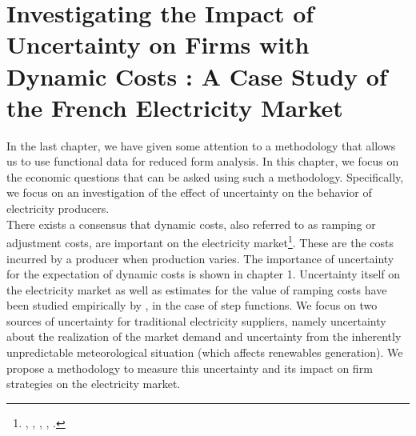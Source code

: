 

\renewcommand{\thesection}{\arabic{chapter}.\arabic{section}}


\chapter{Investigating the Impact of Uncertainty on Firms with Dynamic Costs : A Case Study of the French Electricity Market}
\label{chap:ch2}
\cleardoublepage

\doublespacing
In the last chapter, we have given some attention to a methodology that allows us to use functional data for reduced form analysis. In this chapter, we focus on the economic questions that can be asked using such a methodology. Specifically, we focus on an investigation of the effect of uncertainty on the behavior of electricity producers. \\

There exists a consensus that dynamic costs, also referred to as ramping or adjustment costs, are important on the electricity market\footnote{ \cite{anderson2005supply},  \cite{hobbs2001next}, \cite{hortacsu2008understanding}, \cite{reguant2011welfare}, \cite{sewalt2003negative}. }. These are the costs incurred by a producer when production varies. 
The importance of uncertainty for the expectation of dynamic costs is shown in chapter 1. Uncertainty itself on the electricity market as well as estimates for the value of ramping costs have been studied empirically by \cite{wolak2007quantifying}, in the case of step functions. %
We focus on two sources of uncertainty for traditional electricity suppliers, namely uncertainty about the realization of the market demand and uncertainty from the inherently unpredictable meteorological situation
(which affects renewables generation). 
We propose a methodology to measure this uncertainty and its impact on firm strategies on the electricity market. %

